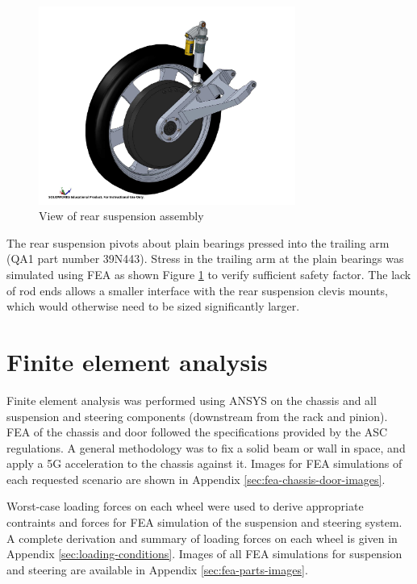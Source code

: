 \documentclass[10pt]{article}
\begin{document}
\begin{figure}
\centering
\includegraphics[width=0.75\textwidth]{figures/rear-suspension}
\caption{View of rear suspension assembly}
\label{fig:rear-suspension}
\end{figure}

The rear suspension pivots about plain bearings pressed into the trailing arm (QA1 part number 39N443). Stress in the trailing arm at the plain bearings was simulated using FEA as shown Figure \ref{fig:rear-suspension} to verify sufficient safety factor. The lack of rod ends allows a smaller interface with the rear suspension clevis mounts, which would otherwise need to be sized significantly larger.

\section{Finite element analysis}
Finite element analysis was performed using ANSYS on the chassis and all suspension and steering components (downstream from the rack and pinion). FEA of the chassis and door followed the specifications provided by the ASC regulations. A general methodology was to fix a solid beam or wall in space, and apply a 5G acceleration to the chassis against it. Images for FEA simulations of each requested scenario are shown in Appendix \ref{sec:fea-chassis-door-images}.

Worst-case loading forces on each wheel were used to derive appropriate contraints and forces for FEA simulation of the suspension and steering system. A complete derivation and summary of loading forces on each wheel is given in Appendix \ref{sec:loading-conditions}. Images of all FEA simulations for suspension and steering are available in Appendix \ref{sec:fea-parts-images}.
\end{document}

